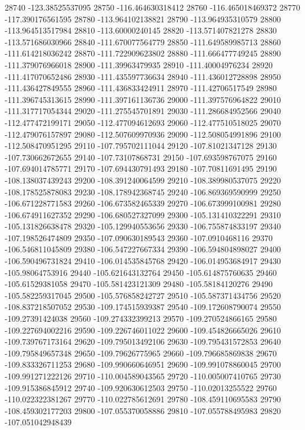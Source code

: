 {28740 -123.38525537095
28750 -116.464630318412
28760 -116.465018469372
28770 -117.390176561595
28780 -113.964102138821
28790 -113.964935310579
28800 -113.964513517984
28810 -113.60000240145
28820 -113.571407821278
28830 -113.571686030966
28840 -111.670077564779
28850 -111.649589985713
28860 -111.614218036242
28870 -111.722909623802
28880 -111.666477749245
28890 -111.379076966018
28900 -111.39963479935
28910 -111.40004976234
28920 -111.417070652486
28930 -111.435597736634
28940 -111.436012728898
28950 -111.436427849555
28960 -111.436833424911
28970 -111.42706517549
28980 -111.396745313615
28990 -111.397161136736
29000 -111.397576964822
29010 -111.317717054344
29020 -111.275545701891
29030 -111.286684952566
29040 -112.477472199171
29050 -112.477094612693
29060 -112.477510518025
29070 -112.479076157897
29080 -112.507609970936
29090 -112.508054991896
29100 -112.508470951295
29110 -107.795702111044
29120 -107.81021347128
29130 -107.730662672655
29140 -107.73107868731
29150 -107.693598767075
29160 -107.694014785771
29170 -107.694430791493
29180 -107.70811691495
29190 -108.138037439243
29200 -108.391240064599
29210 -108.389980537075
29220 -108.178525878083
29230 -108.178942368745
29240 -106.869369590999
29250 -106.671228771583
29260 -106.673582465339
29270 -106.673999100981
29280 -106.674911627352
29290 -106.680527327099
29300 -105.131410322291
29310 -105.131826638478
29320 -105.129940553656
29330 -106.755874833197
29340 -107.198526474809
29350 -107.090630189543
29360 -107.0910468116
29370 -106.546811045809
29380 -106.547227667334
29390 -106.594804898027
29400 -106.590496731824
29410 -106.014535845768
29420 -106.014953684917
29430 -105.98064753916
29440 -105.621643132764
29450 -105.614875760635
29460 -105.61529381058
29470 -105.581423121309
29480 -105.58184120276
29490 -105.582259317045
29500 -105.576858242727
29510 -105.587371434756
29520 -108.837218507052
29530 -109.174515939387
29540 -109.172608790074
29550 -109.27391424038
29560 -109.274332399213
29570 -109.270524866165
29580 -109.227694002216
29590 -109.226746011022
29600 -109.454826665026
29610 -109.739767173164
29620 -109.795013492106
29630 -109.795431572853
29640 -109.795849657348
29650 -109.79626775965
29660 -109.796685869838
29670 -109.833326711253
29680 -109.990660646951
29690 -109.991078860045
29700 -109.991271222126
29710 -110.004589043565
29720 -110.005007410765
29730 -109.915386845912
29740 -109.920630612503
29750 -110.02013255522
29760 -110.022322381267
29770 -110.022785612691
29780 -108.459110695583
29790 -108.459302177203
29800 -107.055370058886
29810 -107.055788495983
29820 -107.051042948439
}
